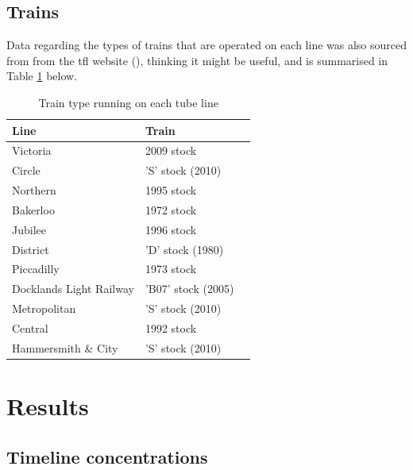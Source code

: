 \subsection{Trains}
\label{subsec:trains}
Data regarding the types of trains that are operated on each line was also sourced from from the \gls{tfl} website (\cite{TransportforLondon2016}), thinking it might be useful, and is summarised in Table \ref{tab:train_type_on_the_underground} below.


\begin{table}[H]
\caption{Train type running on each tube line}
\centering
    \begin{tabular}{ | l | l | l |}
    \hline 
     \bfseries{Line} & \bfseries{Train}             \\ \hline
        Victoria                &   2009 stock      \\ \hline
        Circle                  &   'S' stock (2010)       \\ \hline
        Northern                &   1995 stock      \\ \hline
        Bakerloo                &   1972 stock      \\ \hline
        Jubilee                 &   1996 stock      \\ \hline
        District                &   'D' stock (1980)      \\ \hline
        Piccadilly              &   1973 stock      \\ \hline
        Docklands Light Railway &   'B07' stock (2005)     \\ \hline
        Metropolitan            &   'S' stock (2010)       \\ \hline
        Central                 &   1992 stock      \\ \hline
        Hammersmith \& City     &   'S' stock (2010)       \\ \hline
        \end{tabular}
\label{tab:train_type_on_the_underground}
\end{table}

\section{Results}
\label{sec:3results}

\subsection{Timeline concentrations}
\label{subsec:timeline_concentrations}

